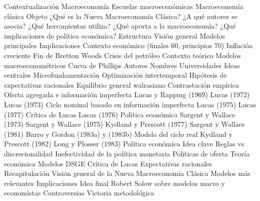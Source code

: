 \documentclass{nuevotema}
\begin{document}
\begin{esquema}[enumerate]
	\1[] 
		\2 Contextualización
			\3 Macroeconomía
			\3 Escuelas macroeconómicas
			\3 Macroeconomía clásica
		\2 Objeto
			\3 ¿Qué es la Nueva Macroeconomía Clásica?
			\3 ¿A qué autores se asocia?
			\3 ¿Qué herramientas utiliza?
			\3 ¿Qué aporta a la macroeconomía?
			\3 ¿Qué implicaciones de política económica?
		\2 Estructura
			\3 Visión general
			\3 Modelos principales
			\3 Implicaciones
	\1 
		\2 Contexto económico (finales 60, principios 70)
			\3 Inflación creciente
			\3 Fin de Bretton Woods
			\3 Crisis del petróleo
		\2 Contexto teórico
			\3 Modelos macroeconométricos
			\3 Curva de Phillips
		\2 Autores
			\3 Nombres
			\3 Universidades
		\2 Ideas centrales
			\3 Microfundamentación
			\3 Optimización intertemporal
			\3 Hipótesis de expectativas racionales
			\3 Equilibrio general walrasiano
			\3 Contrastación empírica
	\1 
		\2 Oferta agregada e información imperfecta
			\3 Lucas y Rapping (1969)
			\3 Lucas (1972)
			\3 Lucas (1973)
		\2 Ciclo nominal basado en información imperfecta
			\3 Lucas (1975)
			\3 Lucas (1977)
		\2 Crítica de Lucas
			\3 Lucas (1976)
		\2 Política económica
			\3 Sargent y Wallace (1973)
			\3 Sargent y Wallace (1975)
			\3 Kydland y Prescott (1977)
			\3 Sargent y Wallace (1981)
			\3 Barro y Gordon (1983a) y (1983b)
		\2 Modelo del ciclo real
			\3 Kydland y Prescott (1982)
			\3 Long y Plosser (1983)
	\1 
		\2 Política económica
			\3 Idea clave
			\3 Reglas vs discrecionalidad
			\3 Inefectividad de la política monetaria
			\3 Políticas de oferta
		\2 Teoría económica
			\3 Modelos DSGE
			\3 Crítica de Lucas
			\3 Expectativas racionales
	\1[] 
		\2 Recapitulación
			\3 Visión general de la Nueva Macroeconomía Clásica
			\3 Modelos más relevantes
			\3 Implicaciones
		\2 Idea final
			\3 Robert Solow sobre modelos macro y economistas
			\3 Controversias
			\3 Victoria metodológica

\end{esquema}

\esquemalargo
\end{document}
